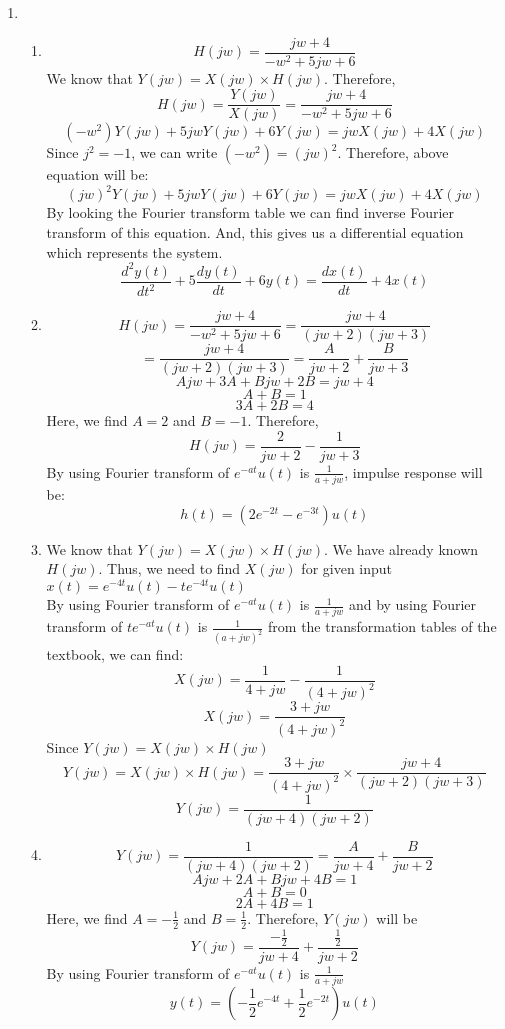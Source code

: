 \documentclass[10pt,a4paper, margin=1in]{article}
\begin{document}
\begin{enumerate}
\item %
    \begin{enumerate}
    \item %
    \[ H(jw) = \frac{jw+4}{-w^2+5jw+6}  \]
    We know that $Y(jw) = X(jw) \times H(jw)$. Therefore, 
    \[ H(jw) = \frac{Y(jw)}{X(jw)} = \frac{jw+4}{-w^2+5jw+6} \]
    \[ (-w^2)Y(jw) +5jwY(jw) +6Y(jw) = jwX(jw)+4X(jw) \]
    Since $j^2 = -1$, we can write $(-w^2) = (jw)^2$. Therefore, above equation will be: 
    \[ (jw)^2Y(jw) +5jwY(jw) +6Y(jw) = jwX(jw)+4X(jw) \]
    By looking the Fourier transform table we can find inverse Fourier transform of this equation. And, this gives us a differential equation which represents the system.
    \[ \frac{d^2y(t)}{dt^2} + 5\frac{dy(t)}{dt} + 6y(t) = \frac{dx(t)}{dt} + 4x(t) \]
    \item %
    \[ H(jw) = \frac{jw+4}{-w^2+5jw+6} = \frac{jw+4}{(jw+2)(jw+3)}  \]
    \[ = \frac{jw+4}{(jw+2)(jw+3)} = \frac{A}{jw+2} + \frac{B}{jw+3}  \]
    \[ Ajw + 3A + Bjw + 2B = jw+4 \]
    \[ A+B = 1 \]
    \[ 3A+2B = 4 \]
    Here, we find $A = 2$ and $B=-1$. Therefore,
    \[ H(jw) = \frac{2}{jw+2} - \frac{1}{jw+3} \]
    By using Fourier transform of $e^{-at}u(t)$ is $\frac{1}{a + jw}$, impulse response will be:
    \[ h(t) = (2e^{-2t} - e^{-3t})u(t) \]
    \item %
    We know that $Y(jw) = X(jw) \times H(jw)$. We have already known $H(jw)$. Thus, we need to find $X(jw)$ for given input $x(t) = e^{-4t}u(t)  -te^{-4t}u(t)$ \\
    By using Fourier transform of $e^{-at}u(t)$ is $\frac{1}{a + jw}$ and by using Fourier transform of $te^{-at}u(t)$ is $\frac{1}{(a + jw)^2}$ from the transformation tables of the textbook, we can find:
    \[ X(jw) = \frac{1}{4+jw} - \frac{1}{(4+jw)^2}  \]
    \[ X(jw) = \frac{3+jw}{(4+jw)^2}  \]
    Since $Y(jw) = X(jw) \times H(jw)$
    \[ Y(jw) = X(jw) \times H(jw) = \frac{3+jw}{(4+jw)^2} \times \frac{jw+4}{(jw+2)(jw+3)} \]
    \[ Y(jw) = \frac{1}{(jw+4)(jw+2)}\]
     
    \item %
    \[ Y(jw) = \frac{1}{(jw+4)(jw+2)} = \frac{A}{jw+4} + \frac{B}{jw+2} \]
    \[ Ajw + 2A +Bjw + 4B = 1 \]
    \[ A+B = 0 \]
    \[ 2A+4B = 1 \]
    Here, we find $A = -\frac{1}{2}$ and $B = \frac{1}{2}$. Therefore, $Y(jw)$ will be
    \[ Y(jw) = \frac{-\frac{1}{2}}{jw+4} + \frac{\frac{1}{2}}{jw+2} \]
    By using Fourier transform of $e^{-at}u(t)$ is $\frac{1}{a + jw}$
    \[ y(t) = (-\frac{1}{2}e^{-4t} + \frac{1}{2}e^{-2t})u(t) \]
    \end{enumerate}


\end{enumerate}
\end{document}
